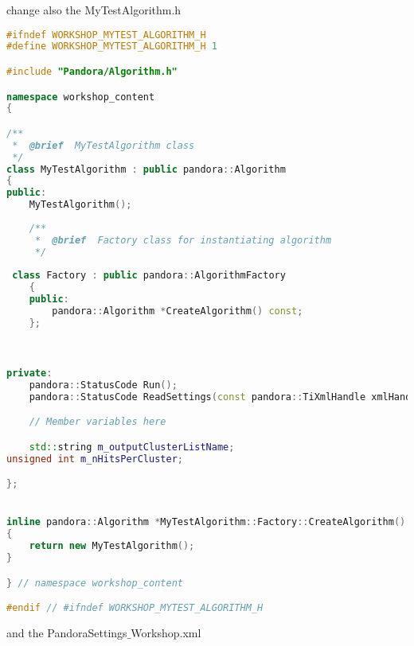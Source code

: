change also the MyTestAlgorithm.h

\begin{lstlisting}[language=C++, label=code:first_cluster.h, caption=MyTestAlgorithm.h]
#ifndef WORKSHOP_MYTEST_ALGORITHM_H
#define WORKSHOP_MYTEST_ALGORITHM_H 1

#include "Pandora/Algorithm.h"

namespace workshop_content
{

/**
 *  @brief  MyTestAlgorithm class
 */
class MyTestAlgorithm : public pandora::Algorithm
{
public:
    MyTestAlgorithm();
	
    /**
     *  @brief  Factory class for instantiating algorithm
     */
  
 class Factory : public pandora::AlgorithmFactory
    {
    public:
        pandora::Algorithm *CreateAlgorithm() const;
    };


	
private:
    pandora::StatusCode Run();
    pandora::StatusCode ReadSettings(const pandora::TiXmlHandle xmlHandle);

    // Member variables here

    std::string m_outputClusterListName;
unsigned int m_nHitsPerCluster;

};


inline pandora::Algorithm *MyTestAlgorithm::Factory::CreateAlgorithm() const
{
    return new MyTestAlgorithm();
}

} // namespace workshop_content

#endif // #ifndef WORKSHOP_MYTEST_ALGORITHM_H
\end{lstlisting}

and the PandoraSettings${\_}$Workshop.xml

